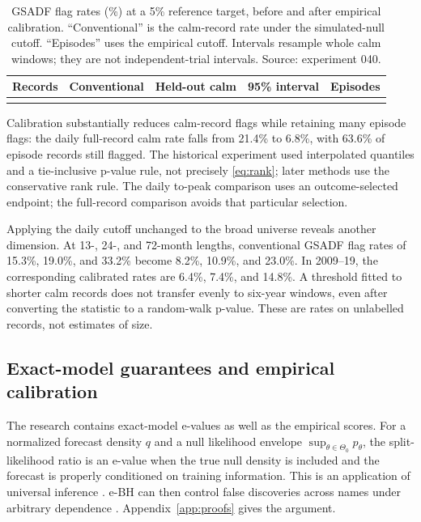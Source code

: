 \begin{table}[htbp]\centering\small
\begin{tabularx}{\linewidth}{@{}Yrrrr@{}}\toprule
Records & Conventional & Held-out calm & 95\% interval & Episodes\\
\midrule
{}
\bottomrule\end{tabularx}
\caption{GSADF flag rates (\%) at a 5\% reference target, before and after
empirical calibration. ``Conventional'' is the calm-record rate under the
simulated-null cutoff. ``Episodes'' uses the empirical cutoff. Intervals
resample whole calm windows; they are not independent-trial intervals.
Source: experiment 040.}\label{tab:gsadfcal}
\end{table}

Calibration substantially reduces calm-record flags while retaining many
episode flags: the daily full-record calm rate falls from 21.4\% to
6.8\%, with 63.6\% of episode records still flagged. The historical
experiment used interpolated quantiles and a tie-inclusive p-value rule,
not precisely \eqref{eq:rank}; later methods use the conservative rank rule.
The daily to-peak comparison uses an outcome-selected endpoint; the
full-record comparison avoids that particular selection.

Applying the daily cutoff unchanged to the broad universe reveals another
dimension. At 13-, 24-, and 72-month lengths, conventional GSADF flag rates
of 15.3\%, 19.0\%, and 33.2\% become 8.2\%, 10.9\%, and 23.0\%. In
2009--19, the corresponding calibrated rates are 6.4\%, 7.4\%, and 14.8\%.
A threshold fitted to shorter calm records does not transfer evenly to
six-year windows, even after converting the statistic to a random-walk
p-value. These are rates on unlabelled records, not estimates of size.

\subsection{Exact-model guarantees and empirical calibration}
The research contains exact-model e-values as well as the empirical scores.
For a normalized forecast density $q$ and a null likelihood envelope
$\sup_{\theta\in\Theta_0}p_\theta$, the split-likelihood ratio is an e-value
when the true null density is included and the forecast is properly
conditioned on training information. This is an application of universal
inference \cite{wasserman2019universal}. e-BH can then control false
discoveries across names under arbitrary dependence
\cite{wang2020false}. Appendix~\ref{app:proofs} gives the argument.


